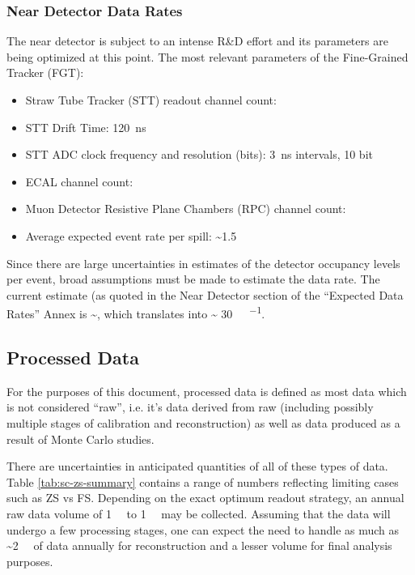 \subsubsection{Near Detector Data Rates}
The near detector is subject to an intense R\&D effort and
its parameters are being optimized at this point. The
most relevant parameters of the Fine-Grained Tracker (FGT):
\begin{itemize}
\item   Straw Tube Tracker (STT) readout channel count: \ndsstchannels
\item STT Drift Time: 120~ns
\item STT ADC clock frequency and resolution (bits): \SI{3}{\ns} intervals, 10 bit
\item ECAL channel count: \ndecalchannels
\item Muon Detector Resistive Plane Chambers (RPC) channel count: \ndmuidchannels
\item Average expected event rate per spill: \textasciitilde 1.5
\end{itemize}
Since there are large uncertainties in estimates of the detector
occupancy levels per event, broad assumptions must be made to
estimate the data rate. The current estimate (as quoted in the Near
Detector section of the ``Expected Data Rates'' Annex is
\textasciitilde \nddatarate, which translates into \textasciitilde
\SI{30}{\tera\byte\per\year}.


\subsection{Processed Data}
\label{sec:detectors-sc-infrastructure-processed-data}
For the purposes of this document, processed data is defined as most
data which is not considered ``raw'', i.e. it's data derived from raw
(including possibly multiple stages of calibration and reconstruction)
as well as data produced as a result of Monte Carlo studies.

There are uncertainties in anticipated quantities of all of these
types of data. Table \ref{tab:sc-zs-summary} contains a range of
numbers reflecting limiting cases such as ZS vs FS.  Depending on the
exact optimum readout strategy, an annual raw data volume of
\SI{1}{\tera\byte} to \SI{1}{\peta\byte} may be collected.  Assuming
that the data will undergo a few processing stages, one can expect the
need to handle as much as \textasciitilde \SI{2}{\peta\byte} of data
annually for reconstruction and a lesser volume for final analysis
purposes.

